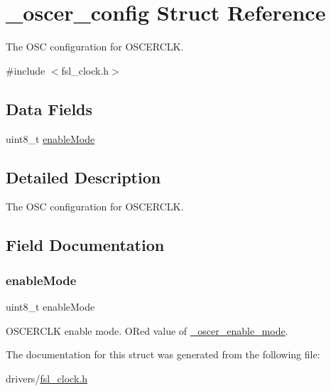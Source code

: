 \hypertarget{struct__oscer__config}{}\section{\+\_\+oscer\+\_\+config Struct Reference}
\label{struct__oscer__config}


The O\+SC configuration for O\+S\+C\+E\+R\+C\+LK.  




{\ttfamily \#include $<$fsl\+\_\+clock.\+h$>$}

\subsection*{Data Fields}
\begin{DoxyCompactItemize}
\item 
uint8\+\_\+t \mbox{\hyperlink{struct__oscer__config_a88873bcb2d651d3732a3b4ff36d8451c}{enable\+Mode}}
\end{DoxyCompactItemize}


\subsection{Detailed Description}
The O\+SC configuration for O\+S\+C\+E\+R\+C\+LK. 

\subsection{Field Documentation}
\mbox{\label{struct__oscer__config_a88873bcb2d651d3732a3b4ff36d8451c}} 
\subsubsection{\texorpdfstring{enableMode}{enableMode}}
{\footnotesize\ttfamily uint8\+\_\+t enable\+Mode}

O\+S\+C\+E\+R\+C\+LK enable mode. OR\textquotesingle{}ed value of \mbox{\hyperlink{group__clock_ga4d273c4ee3cf6ad651bc9aacc48bc87f}{\+\_\+oscer\+\_\+enable\+\_\+mode}}. 

The documentation for this struct was generated from the following file\+:\begin{DoxyCompactItemize}
\item 
drivers/\mbox{\hyperlink{fsl__clock_8h}{fsl\+\_\+clock.\+h}}\end{DoxyCompactItemize}
